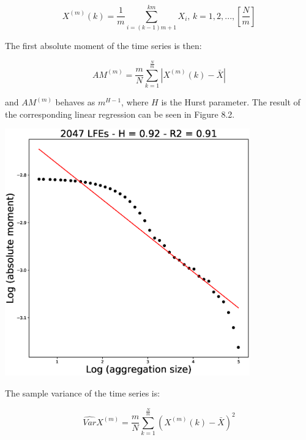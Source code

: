 \documentclass[methods.tex]{subfiles}
\begin{document}
\begin{equation}
X^{\left( m \right)} \left( k \right) = \frac{1}{m} \sum_{i = \left( k - 1 \right) m + 1}^{k m} X_i \text{, } k = 1 , 2 , ... , \left[ \frac{N}{m} \right]
\end{equation}

The first absolute moment of the time series is then:

\begin{equation}
AM^{\left( m \right)} = \frac{m}{N} \sum_{k = 1}^{\frac{N}{m}} \left| X^{\left( m \right)} \left( k \right) - \bar{X} \right|
\end{equation}

and $AM^{\left( m \right)}$ behaves as $m^{H - 1}$, where $H$ is the Hurst parameter. The result of the corresponding linear regression can be seen in Figure 8.2.

\begin{center}
\includegraphics[width=300pt, trim={0cm 0cm 0cm 0cm},clip]{Figures/longrange/absolutevalue.eps}
\captionsetup{type=figure}
\end{center}

The sample variance of the time series is:

\begin{equation}
\hat{Var} X^{\left( m \right)} = \frac{m}{N} \sum_{k = 1}^{\frac{N}{m}} \left( X^{\left( m \right)} \left( k \right) - \bar{X} \right) ^2
\end{equation}
\end{document}
